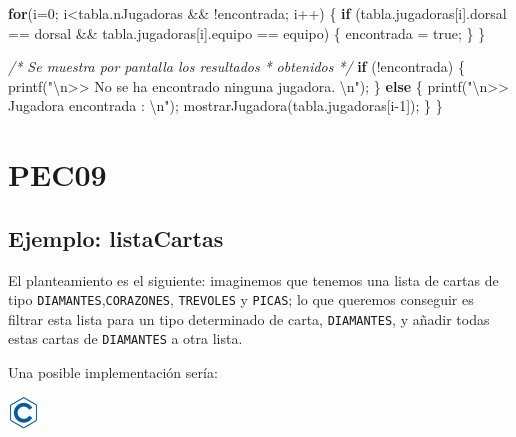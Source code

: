 \documentclass[
]{book}
\newenvironment{Shaded}{\begin{snugshade}}{\end{snugshade}}
\newcommand{\CommentTok}[1]{\textcolor[rgb]{0.56,0.35,0.01}{\textit{#1}}}
\newcommand{\ControlFlowTok}[1]{\textcolor[rgb]{0.13,0.29,0.53}{\textbf{#1}}}
\newcommand{\DecValTok}[1]{\textcolor[rgb]{0.00,0.00,0.81}{#1}}
\newcommand{\NormalTok}[1]{#1}
\newcommand{\SpecialCharTok}[1]{\textcolor[rgb]{0.00,0.00,0.00}{#1}}
\newcommand{\StringTok}[1]{\textcolor[rgb]{0.31,0.60,0.02}{#1}}
\begin{document}
\begin{Shaded}
\begin{Highlighting}[]
    \ControlFlowTok{for}\NormalTok{(i=}\DecValTok{0}\NormalTok{; i\textless{}tabla.nJugadoras \&\& !encontrada; i++) \{}
        \ControlFlowTok{if}\NormalTok{ (tabla.jugadoras[i].dorsal == dorsal \&\&}
\NormalTok{            tabla.jugadoras[i].equipo == equipo) \{}
\NormalTok{                encontrada = true;}
\NormalTok{        \}}
\NormalTok{    \}}
    
    \CommentTok{/* Se muestra por pantalla los resultados}
\CommentTok{     * obtenidos }
\CommentTok{     */}
    \ControlFlowTok{if}\NormalTok{ (!encontrada) \{}
\NormalTok{        printf(}\StringTok{"}\SpecialCharTok{\textbackslash{}n}\StringTok{\textgreater{}\textgreater{} No se ha encontrado ninguna jugadora. }\SpecialCharTok{\textbackslash{}n}\StringTok{"}\NormalTok{);}
\NormalTok{    \} }\ControlFlowTok{else}\NormalTok{ \{}
\NormalTok{        printf(}\StringTok{"}\SpecialCharTok{\textbackslash{}n}\StringTok{\textgreater{}\textgreater{} Jugadora encontrada : }\SpecialCharTok{\textbackslash{}n}\StringTok{"}\NormalTok{);}
\NormalTok{        mostrarJugadora(tabla.jugadoras[i{-}}\DecValTok{1}\NormalTok{]);}
\NormalTok{    \}}
\NormalTok{\}}
\end{Highlighting}
\end{Shaded}

\hypertarget{pec09}{%
\chapter{PEC09}\label{pec09}}

\hypertarget{ejemplo-listacartas}{%
\section{Ejemplo: listaCartas}\label{ejemplo-listacartas}}

El planteamiento es el siguiente: imaginemos que tenemos una lista de cartas de tipo \texttt{DIAMANTES},\texttt{CORAZONES}, \texttt{TREVOLES} y \texttt{PICAS}; lo que queremos conseguir es filtrar esta lista para un tipo determinado de carta, \texttt{DIAMANTES}, y añadir todas estas cartas de \texttt{DIAMANTES} a otra lista.

Una posible implementación sería:

\includegraphics{./img/c.png}
\end{document}
